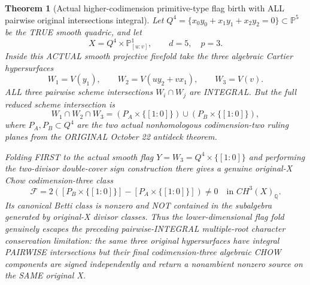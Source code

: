 \documentclass[11pt]{article}
\newtheorem{theorem}{Theorem}
\begin{document}
\begin{theorem}[Actual higher-codimension primitive-type flag birth with ALL pairwise original intersections integral]
Let
$Q^4=\{x_0y_0+x_1y_1+x_2y_2=0\}\subset\mathbb P^5$
be the TRUE smooth quadric, and let
\[
 X=Q^4\times\mathbb P^1_{[u:v]},
 \qquad d=5,\quad p=3.
\]
Inside this ACTUAL smooth projective fivefold take
the three algebraic Cartier hypersurfaces
\[
 W_1=V(y_1),\qquad
 W_2=V(u y_2+v x_1),\qquad
 W_3=V(v).
\]
ALL three pairwise scheme intersections
$W_i\cap W_j$ are INTEGRAL.
But the full reduced scheme intersection is
\[
 \boxed{
 W_1\cap W_2\cap W_3
 =(P_A\times\{[1:0]\})\cup
  (P_B\times\{[1:0]\}),
 }                                                       \tag{21}
\]
where $P_A,P_B\subset Q^4$ are the two actual
nonhomologous codimension-two ruling planes
from the ORIGINAL October 22 antideck theorem.

Folding FIRST to the actual smooth flag
$Y=W_3=Q^4\times\{[1:0]\}$
and performing the two-divisor double-cover
sign construction there gives a genuine
original-X Chow codimension-three class
\[
 \boxed{
 \mathcal F=
 2([P_B\times\{[1:0]\}]
   -[P_A\times\{[1:0]\}])
 \ne0\quad\text{in }CH^3(X)_{\mathbb Q}.}       \tag{22}
\]
Its canonical Betti class is nonzero
and NOT contained in the subalgebra
generated by original-X divisor classes.
Thus the lower-dimensional flag fold
genuinely escapes the preceding
pairwise-INTEGRAL multiple-root
character conservation limitation:
the same three original hypersurfaces
have integral PAIRWISE intersections
but their final codimension-three
algebraic CHOW components are signed
independently and return a nonambient
nonzero source on the SAME original X.
\end{theorem}
\end{document}

